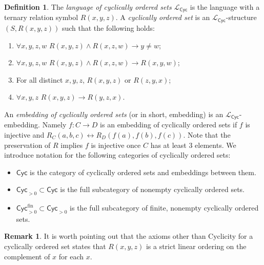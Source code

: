 \documentclass{amsart}
\newcommand{\defterm}[1]{\emph{#1}}
\theoremstyle{plain}
\theoremstyle{definition}
\newtheorem{Def}[thm]{Definition}
\newtheorem{rmk}[thm]{Remark}
\newcommand{\Cyc}{\mathsf{Cyc}}
\newcommand{\fin}{\mathrm{fin}}
\begin{document}
\begin{Def}\label{def:cycord}
The \defterm{language of cyclically ordered sets} $
\mathcal{L}_\Cyc$ is the language with a ternary relation symbol $R(x,y,z)$. A \defterm{cyclically ordered set} is an $\mathcal{L}_\Cyc$-structure $(S,R(x,y,z))$ such that the following holds:
\begin{enumerate}[align=left]
    \item [Asymmetry:] $\forall x,y,z,w$ $R(x,y,z)\wedge R(x,z,w)\rightarrow y\neq w$;
    \item [Transitivity:] $\forall x,y,z,w$ $R(x,y,z)
    \wedge R(x,z,w) \rightarrow R(x,y,w)$;
    \item [Connectedness:] For all distinct $x,y,z$, $R(x,y,z)$ or $R(z,y,x)$;
    \item [Cyclicity:] $\forall x,y,z$ $R(x,y,z)\rightarrow R(y,z,x)$.
\end{enumerate}


An \defterm{embedding of cyclically ordered sets} (or in short, embedding) is an $\mathcal{L}_\Cyc$-embedding. Namely $f:C\to D$ is an embedding of cyclically ordered sets if $f$ is injective and $R_C(a,b,c)\leftrightarrow R_D(f(a),f(b),f(c))$. Note that the preservation of $R$ implies $f$ is injective once $C$ has at least $3$ elements. We introduce notation for the following categories of cyclically ordered sets:
\begin{itemize}
    \item $\Cyc$ is the category of cyclically ordered sets and embeddings between them.
    \item $\Cyc_{>0} \subset \Cyc$ is the full subcategory of nonempty cyclically ordered sets.
    \item $\Cyc^\fin_{>0} \subset \Cyc_{>0}$ is the full subcategory of finite, nonempty cyclically ordered sets.
\end{itemize}
\end{Def}
\begin{rmk}
    It is worth pointing out that the axioms other than Cyclicity for a cyclically ordered set states that $R(x,y,z)$ is a strict linear ordering on the complement of $x$ for each $x$.
\end{rmk}
\end{document}
